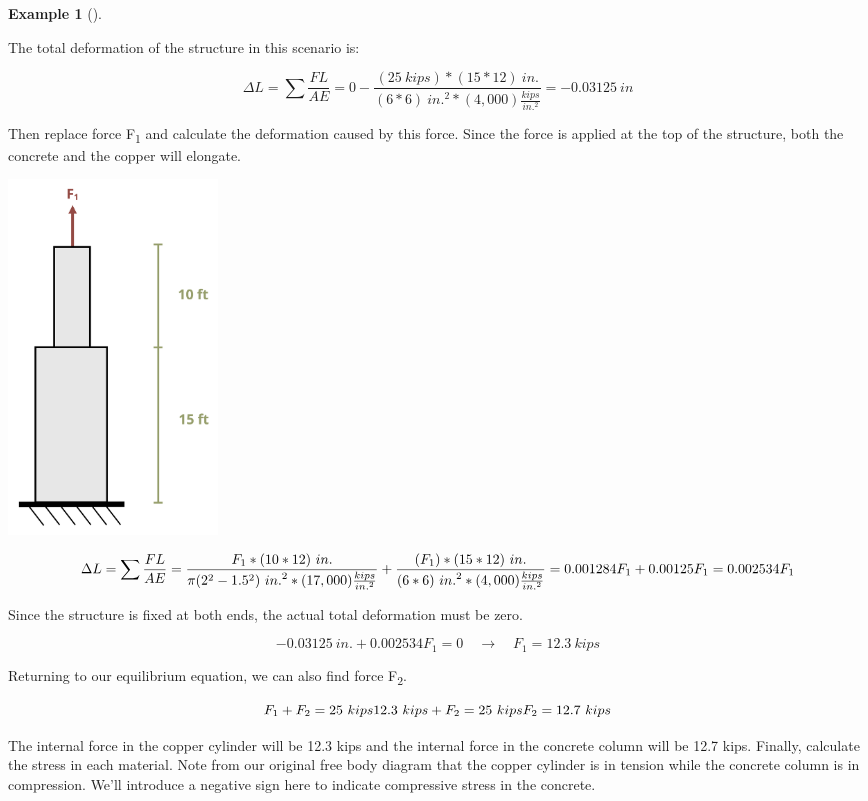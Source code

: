 \documentclass[
  letterpaper,
  DIV=11,
  numbers=noendperiod]{scrreprt}
\theoremstyle{definition}
\newtheorem{example}{Example}[chapter]
\theoremstyle{remark}
\begin{document}
\begin{tcolorbox}
\begin{example}[]
\begin{tcolorbox}
The total deformation of the structure in this scenario is:

\[
\Delta L=\sum \frac{F L}{A E}=0-\frac{(25{~kips}) *(15 * 12){~in.}}{(6 * 6){~in.}^2 *(4,000)\frac{kips}{in.^2}}=-0.03125{~in}
\]

Then replace force F\textsubscript{1} and calculate the deformation
caused by this force. Since the force is applied at the top of the
structure, both the concrete and the copper will elongate.

\begin{center}
\includegraphics[width=2.1875in,height=\textheight]{images/PNGs/Example 5.5 part 4.png}
\end{center}

\[
\Delta L=\sum \frac{F L}{A E}=\frac{F_1 *(10 * 12){~in.}}{\pi(2^2-1.5^2){~in.}^2 *(17,000)\frac{kips}{in.^2}}+\frac{\left(F_1\right) *(15 * 12){~in.}}{(6 * 6){~in.}^2 *(4,000)\frac{kips}{in.^2}} \\
=0.001284F_1+0.00125 F_1 \\
=0.002534 F_1
\]

Since the structure is fixed at both ends, the actual total deformation
must be zero.

\[
-0.03125{~in.}+0.002534 F_1=0 \quad\rightarrow\quad F_1=12.3{~kips}
\]

Returning to our equilibrium equation, we can also find force
F\textsubscript{2}.

\[
F_1+F_2=25{~kips} \\
12.3{~kips}+F_2=25{~kips} \\
F_2=12.7{~kips}
\]

The internal force in the copper cylinder will be 12.3 kips and the
internal force in the concrete column will be 12.7 kips. Finally,
calculate the stress in each material. Note from our original free body
diagram that the copper cylinder is in tension while the concrete column
is in compression. We'll introduce a negative sign here to indicate
compressive stress in the concrete.


\end{tcolorbox}
\end{example}
\end{tcolorbox}
\end{document}
